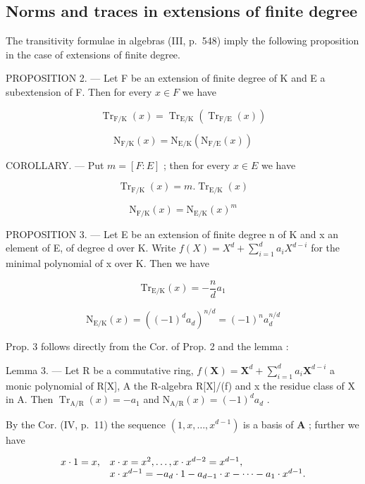 \subsection{Norms and traces in extensions of finite degree}

The transitivity formulae in algebras (III, p.~548) imply the following proposition in the case of extensions of finite degree.

PROPOSITION 2. --- Let F be an extension of finite degree of K and E a subextension of F. Then for every \(x \in F\) we have

\[
\operatorname{Tr} _ {\mathrm{F} / \mathrm{K}} (x) = \operatorname{Tr} _ {\mathrm{E} / \mathrm{K}} (\operatorname{Tr} _ {\mathrm{F} / \mathrm{E}} (x))\tag{6}
\]

\[
\mathrm{N} _ {\mathrm{F} / \mathrm{K}} (x) = \mathrm{N} _ {\mathrm{E} / \mathrm{K}} (\mathrm{N} _ {\mathrm{F} / \mathrm{E}} (x))\tag{7}
\]

COROLLARY. --- Put \(m = [F : E]\) ; then for every \(x \in E\) we have

\[
\operatorname{Tr} _ {\mathrm{F} / \mathrm{K}} (x) = m. \operatorname{Tr} _ {\mathrm{E} / \mathrm{K}} (x)\tag{8}
\]

\[
\mathrm{N} _ {\mathrm{F} / \mathrm{K}} (x) = \mathrm{N} _ {\mathrm{E} / \mathrm{K}} (x) ^ {m}\tag{9}
\]

PROPOSITION 3. --- Let E be an extension of finite degree n of K and x an element of E, of degree d over K. Write \(f(X) = X^d + \sum_{i=1}^{d} a_i X^{d-i}\) for the minimal polynomial of x over K. Then we have

\[
\mathrm{Tr} _ {\mathrm{E/K}} (x) = - \frac {n}{d} a _ {1}\tag{10}
\]

\[
\mathrm{N} _ {\mathrm{E} / \mathrm{K}} (x) = ((- 1) ^ {d} a _ {d}) ^ {n / d} = (- 1) ^ {n} a _ {d} ^ {n / d}\tag{11}
\]

Prop. 3 follows directly from the Cor. of Prop. 2 and the lemma :

Lemma 3. --- Let R be a commutative ring, \(f(\mathbf{X}) = \mathbf{X}^d + \sum_{i=1}^{d} a_i \mathbf{X}^{d-i}\) a monic polynomial of R{[}X{]}, A the R-algebra R{[}X{]}/(f) and x the residue class of X in A. Then \(\operatorname{Tr}_{\mathrm{A/R}}(x) = -a_1\) and \(\mathrm{N}_{\mathrm{A/R}}(x) = (-1)^d a_d\) .

By the Cor. (IV, p.~11) the sequence \((1, x, \ldots, x^{d-1})\) is a basis of \(\mathbf{A}\) ; further we have

\[
\begin{array}{r l} x \cdot 1 = x, & x \cdot x = x ^ {2}, \dots , x \cdot x ^ {d - 2} = x ^ {d - 1}, \\ & x \cdot x ^ {d - 1} = - a _ {d} \cdot 1 - a _ {d - 1} \cdot x - \dots - a _ {1} \cdot x ^ {d - 1}. \end{array}
\]

